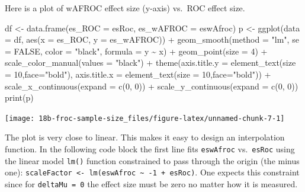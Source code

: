 \documentclass[
]{book}
\newenvironment{Shaded}{\begin{snugshade}}{\end{snugshade}}
\newcommand{\AttributeTok}[1]{\textcolor[rgb]{0.77,0.63,0.00}{#1}}
\newcommand{\ConstantTok}[1]{\textcolor[rgb]{0.00,0.00,0.00}{#1}}
\newcommand{\DecValTok}[1]{\textcolor[rgb]{0.00,0.00,0.81}{#1}}
\newcommand{\FunctionTok}[1]{\textcolor[rgb]{0.00,0.00,0.00}{#1}}
\newcommand{\NormalTok}[1]{#1}
\newcommand{\OtherTok}[1]{\textcolor[rgb]{0.56,0.35,0.01}{#1}}
\newcommand{\SpecialCharTok}[1]{\textcolor[rgb]{0.00,0.00,0.00}{#1}}
\newcommand{\StringTok}[1]{\textcolor[rgb]{0.31,0.60,0.02}{#1}}
\begin{document}
Here is a plot of wAFROC effect size (y-axis) vs.~ROC effect size.

\begin{Shaded}
\begin{Highlighting}[]
\NormalTok{df }\OtherTok{\textless{}{-}} \FunctionTok{data.frame}\NormalTok{(}\AttributeTok{es\_ROC =}\NormalTok{ esRoc, }\AttributeTok{es\_wAFROC =}\NormalTok{ eswAfroc)}
\NormalTok{p }\OtherTok{\textless{}{-}} \FunctionTok{ggplot}\NormalTok{(}\AttributeTok{data =}\NormalTok{ df, }\FunctionTok{aes}\NormalTok{(}\AttributeTok{x =}\NormalTok{ es\_ROC, }\AttributeTok{y =}\NormalTok{ es\_wAFROC)) }\SpecialCharTok{+}
  \FunctionTok{geom\_smooth}\NormalTok{(}\AttributeTok{method =} \StringTok{"lm"}\NormalTok{, }\AttributeTok{se =} \ConstantTok{FALSE}\NormalTok{, }\AttributeTok{color =} \StringTok{"black"}\NormalTok{, }\AttributeTok{formula =}\NormalTok{ y }\SpecialCharTok{\textasciitilde{}}\NormalTok{ x) }\SpecialCharTok{+}
  \FunctionTok{geom\_point}\NormalTok{(}\AttributeTok{size =} \DecValTok{4}\NormalTok{) }\SpecialCharTok{+}
  \FunctionTok{scale\_color\_manual}\NormalTok{(}\AttributeTok{values =} \StringTok{"black"}\NormalTok{) }\SpecialCharTok{+} 
  \FunctionTok{theme}\NormalTok{(}\AttributeTok{axis.title.y =} \FunctionTok{element\_text}\NormalTok{(}\AttributeTok{size =} \DecValTok{10}\NormalTok{,}\AttributeTok{face=}\StringTok{"bold"}\NormalTok{),}
        \AttributeTok{axis.title.x =} \FunctionTok{element\_text}\NormalTok{(}\AttributeTok{size =} \DecValTok{10}\NormalTok{,}\AttributeTok{face=}\StringTok{"bold"}\NormalTok{)) }\SpecialCharTok{+}
  \FunctionTok{scale\_x\_continuous}\NormalTok{(}\AttributeTok{expand =} \FunctionTok{c}\NormalTok{(}\DecValTok{0}\NormalTok{, }\DecValTok{0}\NormalTok{)) }\SpecialCharTok{+} 
  \FunctionTok{scale\_y\_continuous}\NormalTok{(}\AttributeTok{expand =} \FunctionTok{c}\NormalTok{(}\DecValTok{0}\NormalTok{, }\DecValTok{0}\NormalTok{)) }
\FunctionTok{print}\NormalTok{(p)}
\end{Highlighting}
\end{Shaded}

\begin{center}\texttt{[image: 18b-froc-sample-size\_files/figure-latex/unnamed-chunk-7-1]} \end{center}

The plot is very close to linear. This makes it easy to design an interpolation function. In the following code block the first line fits \texttt{eswAfroc} vs.~\texttt{esRoc} using the linear model \texttt{lm()} function constrained to pass through the origin (the minus one): \texttt{scaleFactor\ \textless{}-\ lm(eswAfroc\ \textasciitilde{}\ -1\ +\ esRoc)}. One expects this constraint since for \texttt{deltaMu\ =\ 0} the effect size must be zero no matter how it is measured.
\end{document}
